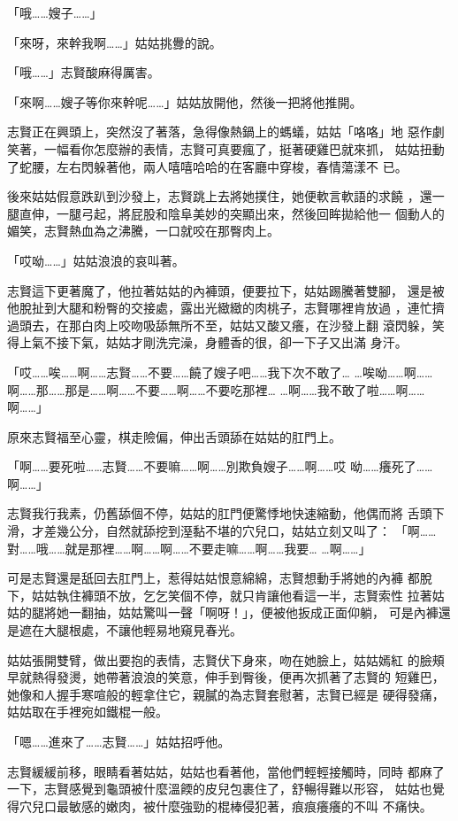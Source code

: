 「哦……嫂子……」

「來呀，來幹我啊……」姑姑挑釁的說。

「哦……」志賢酸麻得厲害。

「來啊……嫂子等你來幹呢……」姑姑放開他，然後一把將他推開。

志賢正在興頭上，突然沒了著落，急得像熱鍋上的螞蟻，姑姑「咯咯」地
惡作劇笑著，一幅看你怎麼辦的表情，志賢可真要瘋了，挺著硬雞巴就來抓，
姑姑扭動了蛇腰，左右閃躲著他，兩人嘻嘻哈哈的在客廳中穿梭，春情蕩漾不
已。

後來姑姑假意跌趴到沙發上，志賢跳上去將她撲住，她便軟言軟語的求饒
，還一腿直伸，一腿弓起，將屁股和陰阜美妙的突顯出來，然後回眸拋給他一
個動人的媚笑，志賢熱血為之沸騰，一口就咬在那臀肉上。

「哎呦……」姑姑浪浪的哀叫著。

志賢這下更著魔了，他拉著姑姑的內褲頭，便要拉下，姑姑踢騰著雙腳，
還是被他脫扯到大腿和粉臀的交接處，露出光緻緻的肉桃子，志賢哪裡肯放過
，連忙擠過頭去，在那白肉上咬吻吸舔無所不至，姑姑又酸又癢，在沙發上翻
滾閃躲，笑得上氣不接下氣，姑姑才剛洗完澡，身體香的很，卻一下子又出滿
身汗。

「哎……唉……啊……志賢……不要……饒了嫂子吧……我下次不敢了…
…唉呦……啊……啊……那……那是……啊……不要……啊……不要吃那裡…
…啊……我不敢了啦……啊……啊……」

原來志賢福至心靈，棋走險偏，伸出舌頭舔在姑姑的肛門上。

「啊……要死啦……志賢……不要嘛……啊……別欺負嫂子……啊……哎
呦……癢死了……啊……」

志賢我行我素，仍舊舔個不停，姑姑的肛門便驚悸地快速縮動，他偶而將
舌頭下滑，才差幾公分，自然就舔挖到溼黏不堪的穴兒口，姑姑立刻又叫了：
「啊……對……哦……就是那裡……啊……啊……不要走嘛……啊……我要…
…啊……」

可是志賢還是舐回去肛門上，惹得姑姑恨意綿綿，志賢想動手將她的內褲
都脫下，姑姑執住褲頭不放，乞乞笑個不停，就只肯讓他看這一半，志賢索性
拉著姑姑的腿將她一翻抽，姑姑驚叫一聲「啊呀！」，便被他扳成正面仰躺，
可是內褲還是遮在大腿根處，不讓他輕易地窺見春光。

姑姑張開雙臂，做出要抱的表情，志賢伏下身來，吻在她臉上，姑姑嫣紅
的臉頰早就熱得發燙，她帶著浪浪的笑意，伸手到臀後，便再次抓著了志賢的
短雞巴，她像和人握手寒喧般的輕拿住它，親膩的為志賢套慰著，志賢已經是
硬得發痛，姑姑取在手裡宛如鐵棍一般。

「嗯……進來了……志賢……」姑姑招呼他。

志賢緩緩前移，眼睛看著姑姑，姑姑也看著他，當他們輕輕接觸時，同時
都麻了一下，志賢感覺到龜頭被什麼溫餪的皮兒包裹住了，舒暢得難以形容，
姑姑也覺得穴兒口最敏感的嫩肉，被什麼強勁的棍棒侵犯著，痕痕癢癢的不叫
不痛快。

